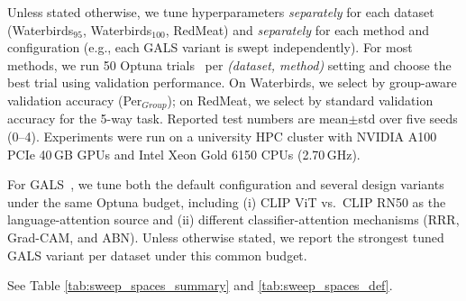 \documentclass[10pt,twocolumn,letterpaper]{article}
\begin{document}
Unless stated otherwise, we tune hyperparameters \emph{separately} for each dataset (Waterbirds$_{95}$, Waterbirds$_{100}$, RedMeat) and \emph{separately} for each method and configuration (e.g., each GALS variant is swept independently). For most methods, we run 50 Optuna trials~\cite{akiba2019optuna} per \emph{(dataset, method)} setting and choose the best trial using validation performance. On Waterbirds, we select by group-aware validation accuracy (Per$_{Group}$); on RedMeat, we select by standard validation accuracy for the 5-way task. Reported test numbers are mean$\pm$std over five seeds (0--4). Experiments were run on a university HPC cluster with NVIDIA A100 PCIe 40\,GB GPUs and Intel Xeon Gold 6150 CPUs (2.70\,GHz).


For GALS~\cite{petryk2022guiding}, we tune both the default configuration and several design variants under the same Optuna budget, including (i) CLIP ViT vs.\ CLIP RN50 as the language-attention source and (ii) different classifier-attention mechanisms (RRR, Grad-CAM, and ABN). Unless otherwise stated, we report the strongest tuned GALS variant per dataset under this common budget.

See Table \ref{tab:sweep_spaces_summary} and \ref{tab:sweep_spaces_def}. 
\end{document}
